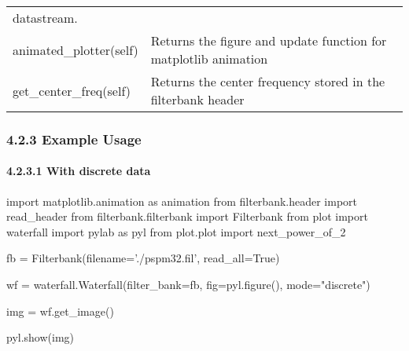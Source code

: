 \documentclass[]{article}
\newenvironment{Shaded}{}{}
\newcommand{\StringTok}[1]{\textcolor[rgb]{0.25,0.44,0.63}{#1}}
\newcommand{\ImportTok}[1]{#1}
\newcommand{\VariableTok}[1]{\textcolor[rgb]{0.10,0.09,0.49}{#1}}
\newcommand{\OperatorTok}[1]{\textcolor[rgb]{0.40,0.40,0.40}{#1}}
\newcommand{\NormalTok}[1]{#1}
\let\oldparagraph\paragraph
\renewcommand{\paragraph}[1]{\oldparagraph{#1}\mbox{}}
\begin{document}
\begin{longtable}[]{@{}ll@{}}
\begin{minipage}[t]{0.67\columnwidth}
datastream.\strut
\end{minipage}\tabularnewline
\begin{minipage}[t]{0.27\columnwidth}\raggedright\strut
animated\_plotter(self)\strut
\end{minipage} & \begin{minipage}[t]{0.67\columnwidth}\raggedright\strut
Returns the figure and update function for matplotlib animation\strut
\end{minipage}\tabularnewline
\begin{minipage}[t]{0.27\columnwidth}\raggedright\strut
get\_center\_freq(self)\strut
\end{minipage} & \begin{minipage}[t]{0.67\columnwidth}\raggedright\strut
Returns the center frequency stored in the filterbank header\strut
\end{minipage}\tabularnewline
\bottomrule
\end{longtable}

\subsubsection{4.2.3 Example Usage}\label{example-usage-3}

\paragraph{4.2.3.1 With discrete data}\label{with-discrete-data}

\begin{Shaded}
\begin{Highlighting}[]
\ImportTok{import}\NormalTok{ matplotlib.animation }\ImportTok{as}\NormalTok{ animation}
\ImportTok{from}\NormalTok{ filterbank.header }\ImportTok{import}\NormalTok{ read_header}
\ImportTok{from}\NormalTok{ filterbank.filterbank }\ImportTok{import}\NormalTok{ Filterbank}
\ImportTok{from}\NormalTok{ plot }\ImportTok{import}\NormalTok{ waterfall}
\ImportTok{import}\NormalTok{ pylab }\ImportTok{as}\NormalTok{ pyl}
\ImportTok{from}\NormalTok{ plot.plot }\ImportTok{import}\NormalTok{ next_power_of_2}

\NormalTok{fb }\OperatorTok{=}\NormalTok{ Filterbank(filename}\OperatorTok{=}\StringTok{'./pspm32.fil'}\NormalTok{, read_all}\OperatorTok{=}\VariableTok{True}\NormalTok{)}

\NormalTok{wf }\OperatorTok{=}\NormalTok{ waterfall.Waterfall(filter_bank}\OperatorTok{=}\NormalTok{fb, fig}\OperatorTok{=}\NormalTok{pyl.figure(), mode}\OperatorTok{=}\StringTok{"discrete"}\NormalTok{)}

\NormalTok{img }\OperatorTok{=}\NormalTok{ wf.get_image()}

\NormalTok{pyl.show(img)}
\end{Highlighting}
\end{Shaded}
\end{document}
